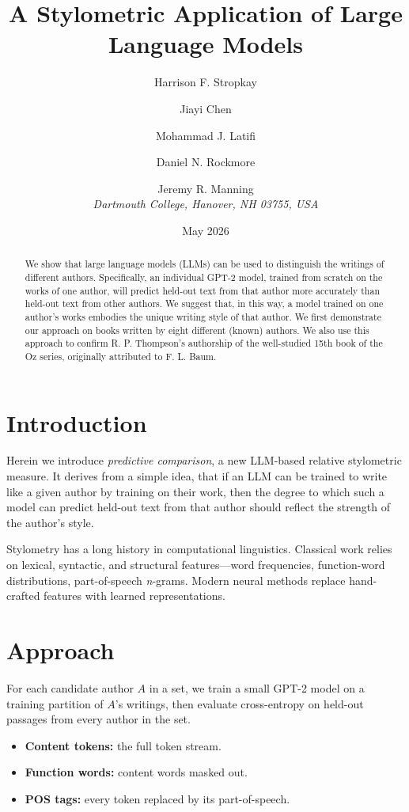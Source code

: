 \documentclass[11pt]{llmxive}
\title{A Stylometric Application of Large Language Models}
\author{Harrison F. Stropkay \and Jiayi Chen \and Mohammad J. Latifi \and
        Daniel N. Rockmore \and Jeremy R. Manning\\[0.3em]
        \normalsize\itshape Dartmouth College, Hanover, NH 03755, USA}
\date{May 2026}
\begin{document}
\maketitle

\begin{abstract}
We show that large language models (LLMs) can be used to distinguish the
writings of different authors. Specifically, an individual GPT-2 model,
trained from scratch on the works of one author, will predict held-out text
from that author more accurately than held-out text from other authors. We
suggest that, in this way, a model trained on one author's works embodies the
unique writing style of that author. We first demonstrate our approach on
books written by eight different (known) authors. We also use this approach to
confirm R. P. Thompson's authorship of the well-studied 15th book of the Oz
series, originally attributed to F. L. Baum.
\end{abstract}

\section{Introduction}
Herein we introduce \emph{predictive comparison}, a new LLM-based relative
stylometric measure. It derives from a simple idea, that if an LLM can be
trained to write like a given author by training on their work, then the
degree to which such a model can predict held-out text from that author
should reflect the strength of the author's style.

Stylometry has a long history in computational linguistics. Classical work
relies on lexical, syntactic, and structural features---word frequencies,
function-word distributions, part-of-speech \emph{n}-grams. Modern neural
methods replace hand-crafted features with learned representations.

\section{Approach}
For each candidate author $A$ in a set, we train a small GPT-2 model on a
training partition of $A$'s writings, then evaluate cross-entropy on
held-out passages from every author in the set.

\begin{itemize}
  \item \textbf{Content tokens:} the full token stream.
  \item \textbf{Function words:} content words masked out.
  \item \textbf{POS tags:} every token replaced by its part-of-speech.
\end{itemize}
\end{document}
